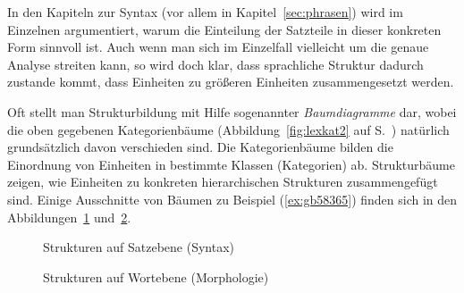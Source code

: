 In den Kapiteln zur Syntax (vor allem in Kapitel~\ref{sec:phrasen}) wird im Einzelnen argumentiert, warum die Einteilung der Satzteile in dieser konkreten Form sinnvoll ist.
Auch wenn man sich im Einzelfall vielleicht um die genaue Analyse streiten kann, so wird doch klar, dass sprachliche Struktur dadurch zustande kommt, dass Einheiten zu größeren Einheiten zusammengesetzt werden.



Oft stellt man Strukturbildung mit Hilfe sogenannter \textit{Baumdiagramme} dar, wobei die oben gegebenen Kategorienbäume (\zB Abbildung~\ref{fig:lexkat2} auf S.~\pageref{fig:lexkat2}) natürlich grundsätzlich davon verschieden sind.
Die Kategorienbäume bilden die Einordnung von Einheiten in bestimmte Klassen (Kategorien) ab.
Strukturbäume zeigen, wie Einheiten zu konkreten hierarchischen Strukturen zusammengefügt sind.
Einige Ausschnitte von Bäumen zu Beispiel (\ref{ex:gb58365}) finden sich in den Abbildungen~\ref{fig:gb5836a} und~\ref{fig:gb5836b}.

\begin{figure}[!htbp]
  \centering
  \caption{Strukturen auf Satzebene (Syntax)}
  \label{fig:gb5836a}
\end{figure}

\begin{figure}[!htbp]
  \centering
  \caption{Strukturen auf Wortebene (Morphologie)}
  \label{fig:gb5836b}
\end{figure}

